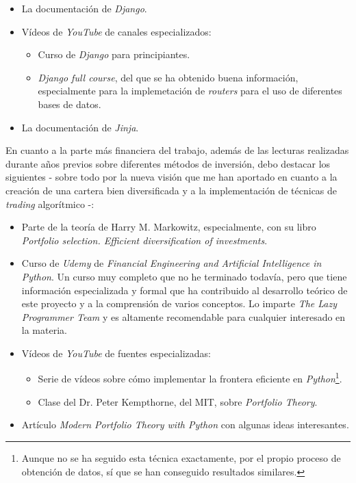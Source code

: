 \begin{itemize}
\tightlist
\item  
La documentación de \emph{Django}\citep{online:django_doc}. 
\item
Vídeos de \emph{YouTube} de canales especializados: 
\begin{itemize}
\item
Curso de \emph{Django} para principiantes\citep{online:django_fatz}.
\item
\emph{Django full course}, del que se ha obtenido buena información, especialmente para la implemetación de \emph{routers} para el uso de diferentes bases de datos\citep{online:django_full_course}.
\end{itemize}
\item
La documentación de \emph{Jinja}\citep{online:jinja_doc}.
\end{itemize}

En cuanto a la parte más financiera del trabajo, además de las lecturas realizadas durante años previos sobre diferentes métodos de inversión, debo destacar los siguientes - sobre todo por la nueva visión que me han aportado en cuanto a la creación de una cartera bien diversificada y a la implementación de técnicas de \emph{trading} algorítmico -:

\begin{itemize}
\tightlist
\item  
Parte de la teoría de Harry M. Markowitz, especialmente, con su libro \emph{Portfolio selection. Efficient diversification of investments}\citep{book:Portfolio_selection}.
\item 
Curso de \emph{Udemy} de \emph{Financial Engineering and Artificial Intelligence in Python}. Un curso muy completo que no he terminado todavía, pero que tiene información 
especializada y formal que ha contribuido al desarrollo teórico de este proyecto y a la comprensión de varios conceptos. Lo imparte \emph{The Lazy Programmer Team} y es altamente recomendable para cualquier interesado en la materia\citep{online:financial_engineering}. 
\item
Vídeos de \emph{YouTube} de fuentes especializadas: 
\begin{itemize}
\item
Serie de vídeos sobre cómo implementar la frontera eficiente en \emph{Python}\citep{online:efficient_frontier}\footnote{Aunque no se ha seguido esta técnica exactamente, por el propio proceso de obtención de datos, sí que se han conseguido resultados similares.}. 
\item
Clase del Dr. Peter Kempthorne, del MIT, sobre \emph{Portfolio Theory}\citep{online:portfolio_theory_mit}.
\end{itemize}
\item
Artículo \emph{Modern Portfolio Theory with Python} con algunas ideas interesantes\citep{online:mpt_python_medium}.
\end{itemize}

